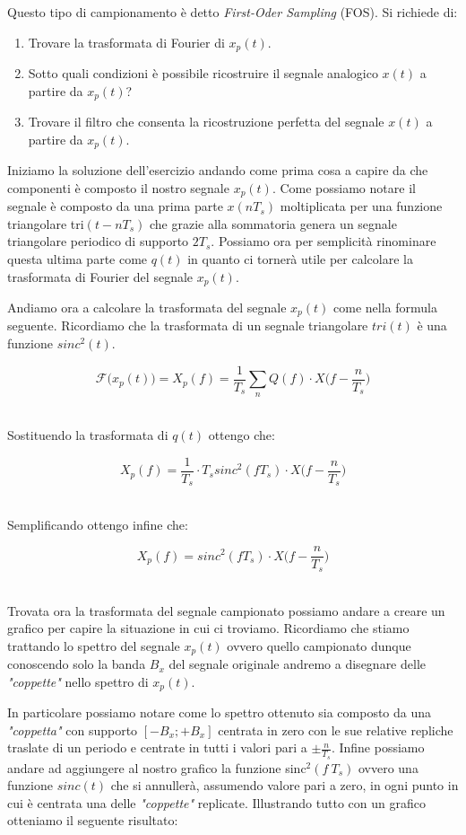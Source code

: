 \documentclass[../main.tex]{subfiles}
\begin{document}
Questo tipo di campionamento è detto \textit{First-Oder Sampling} (FOS).
Si richiede di:

\begin{enumerate}
	\item[\textbf{-}] Trovare la trasformata di Fourier di $x_p(t)$.
	\item[\textbf{-}] Sotto quali condizioni è possibile ricostruire il segnale analogico $x(t)$ a partire da $x_p(t)$?
	\item[\textbf{-}] Trovare il filtro che consenta la ricostruzione perfetta del segnale $x(t)$ a partire da $x_p(t)$.
\end{enumerate}

Iniziamo la soluzione dell'esercizio andando come prima cosa a capire da che componenti è composto il nostro segnale $x_p(t)$. Come possiamo notare il segnale è composto da una prima parte $x(nT_s)$ moltiplicata per una funzione triangolare tri$(t - nT_s)$ che grazie alla sommatoria genera un segnale triangolare periodico di supporto $2T_s$. Possiamo ora per semplicità rinominare questa ultima parte come $q(t)$ in quanto ci tornerà utile per calcolare la trasformata di Fourier del segnale $x_p(t)$.

Andiamo ora a calcolare la trasformata del segnale $x_p(t)$ come nella formula seguente. Ricordiamo che la trasformata di un segnale triangolare $tri(t)$ è una funzione $sinc^2(t)$.

\[ \mathcal{F}\big( x_p(t) \big) = X_p(f) = \frac{1}{T_s} \sum_n Q(f) \cdot X\bigg(f - \frac{n}{T_s}\bigg)  \]\

Sostituendo la trasformata di $q(t)$ ottengo che:


\[ X_p(f) = \frac{1}{T_s} \cdot T_s \unit{sinc}^2(fT_s) \cdot X\bigg(f - \frac{n}{T_s}\bigg)  \]\

Semplificando ottengo infine che:

\[ X_p(f) = \unit{sinc}^2(fT_s) \cdot X\bigg(f - \frac{n}{T_s}\bigg)  \]\

Trovata ora la trasformata del segnale campionato possiamo andare a creare un grafico per capire la situazione in cui ci troviamo.
Ricordiamo che stiamo trattando lo spettro del segnale $x_p(t)$ ovvero quello campionato dunque conoscendo solo la banda $B_x$ del segnale originale andremo a disegnare delle \textit{"coppette"} nello spettro di $x_p(t)$.

In particolare possiamo notare come lo spettro ottenuto sia composto da una \textit{"coppetta"} con supporto $[-B_x; +B_x]$ centrata in zero con le sue relative repliche traslate di un periodo e centrate in tutti i valori pari a $\pm \tfrac{n}{T_s}$. Infine possiamo andare ad aggiungere al nostro grafico la funzione sinc$^2(f\:T_s)$ ovvero una funzione $sinc(t)$ che si annullerà, assumendo valore pari a zero, in ogni punto in cui è centrata una delle \textit{"coppette"} replicate.
Illustrando tutto con un grafico otteniamo il seguente risultato:
\end{document}
